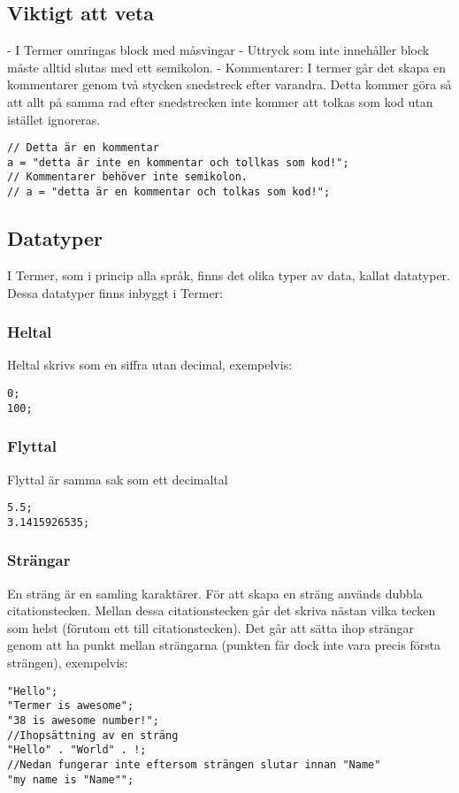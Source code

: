 \documentclass{TDP003mall}
\begin{document}
\newpage

\subsection{Viktigt att veta}
- I Termer omringas block med måsvingar
- Uttryck som inte innehåller block måste alltid slutas med ett semikolon.
- Kommentarer:
I termer går det skapa en kommentarer genom två stycken snedstreck efter varandra. Detta kommer göra så att allt på samma rad efter snedstrecken inte kommer att tolkas som kod utan istället ignoreras.
\begin{lstlisting}
// Detta är en kommentar
a = "detta är inte en kommentar och tollkas som kod!";
// Kommentarer behöver inte semikolon.
// a = "detta är en kommentar och tolkas som kod!"; 
\end{lstlisting}

\subsection{Datatyper}
I Termer, som i princip alla språk, finns det olika typer av data, kallat datatyper. Dessa datatyper finns inbyggt i Termer:
\subsubsection{Heltal}
Heltal skrivs som en siffra utan decimal, exempelvis:
\begin{lstlisting}
0;
100;
\end{lstlisting}

\subsubsection{Flyttal}
Flyttal är samma sak som ett decimaltal
\begin{lstlisting}
5.5;
3.1415926535;
\end{lstlisting}

\subsubsection{Strängar}
En sträng är en samling karaktärer. För att skapa en sträng används dubbla citationstecken. Mellan dessa citationstecken går det skriva nästan vilka tecken som helst (förutom ett till citationstecken). Det går att sätta ihop strängar genom att ha punkt mellan strängarna (punkten får dock inte vara precis första strängen),  exempelvis:
\begin{lstlisting}
"Hello";
"Termer is awesome";
"38 is awesome number!";
//Ihopsättning av en sträng
"Hello" . "World" . !;
//Nedan fungerar inte eftersom strängen slutar innan "Name"
"my name is "Name"";
\end{lstlisting}
\end{document}
